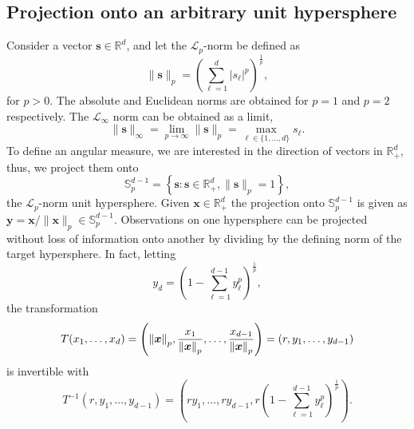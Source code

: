 \subsection{Projection onto an arbitrary unit hypersphere\label{subsec:projection}}

Consider a vector $\bm{s} \in {\mathbb R}^d$, and let the $\mathcal{L}_p$-norm be defined as
  \begin{equation*}
    \lVert \bm{s} \rVert_p = \left({\textstyle\sum}_{\ell = 1}^d \lvert s_{\ell}\rvert^p\right)^{\frac{1}{p}},
  \end{equation*}
for $p>0$. The absolute and Euclidean norms are obtained for $p=1$ and $p=2$ respectively. 
The $\mathcal{L}_{\infty}$ norm can be obtained as a limit, 
  \begin{equation*}
    \lVert \bm{s} \rVert_{\infty}
      = \lim\limits_{p\to\infty} \lVert \bm{s} \rVert_p
      = \max_{\ell\in\lbrace1,\ldots,d\rbrace}s_{\ell}.
  \end{equation*}
To define an angular measure,  we are interested in the direction of
vectors in ${\mathbb R}_{+}^d$, thus, we project them onto
  \begin{equation*}
    {\mathbb S}_{p}^{d-1} = \left\lbrace \bm{s} : \bm{s} \in {\mathbb R}_{+}^{d}, \lVert \bm{s}\rVert_{p} = 1\right\rbrace,
  \end{equation*}
  the $\mathcal{L}_p$-norm unit hypersphere.
  Given $\bm{x}\in {\mathbb R}^d_+$ the projection onto ${\mathbb S}_{p}^{d-1}$ is given as
  $\bm{y} = \bm{x} / \lVert \bm{x}\rVert_p \in {\mathbb S}_{p}^{d-1}$.
  Observations on one hypersphere can be projected without loss of information onto another by
  dividing by the defining norm of the target hypersphere. In fact, letting 
  \begin{equation*}
    y_d = \left(1 - {\textstyle\sum}_{\ell = 1}^{d-1}y_{\ell}^p\right)^{\frac{1}{p}},
  \end{equation*}
  the transformation
  \begin{equation}
    \label{eqn:pnormt}
    T(x_1,\ldots,x_d) = \left(\pnorm{\bm{x}}{p}, \frac{x_1}{\pnorm{\bm{x}}{p}},
                          \ldots , \frac{x_{d-1}}{\pnorm{\bm{x}}{p}}\right) = (r,y_1,\ldots,y_{d-1})
  \end{equation}
  is invertible with
  \begin{equation}
    \label{eqn:pnormtinv}
    T^{-1}\left(r,y_1,\ldots,y_{d-1}\right) =
      \left(ry_1,\ldots,ry_{d-1}, r\left(1 - {\textstyle\sum}_{\ell = 1}^{d-1}y_{\ell}^p\right)^{\frac{1}{p}}\right).
  \end{equation}
